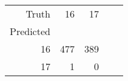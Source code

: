 \begin{table}[h]
\centering
\label{table:5}
\begin{tabular}{rrrrr}
\toprule
Truth & 16 & 17 \\
Predicted &  &  \\
\midrule
16 & 477 & 389 \\
17 & 1 & 0 \\
\bottomrule
\end{tabular}
\end{table}
